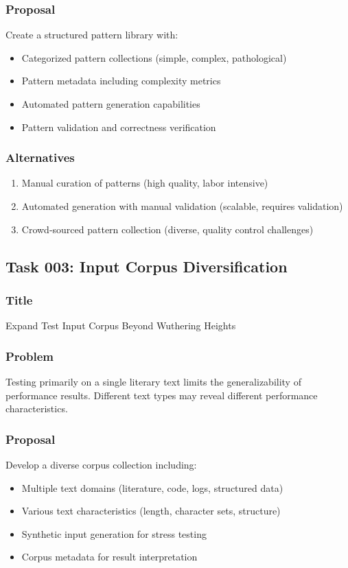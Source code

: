 \documentclass[11pt,a4paper]{article}
\begin{document}
\subsubsection{Proposal}
Create a structured pattern library with:
\begin{itemize}
    \item Categorized pattern collections (simple, complex, pathological)
    \item Pattern metadata including complexity metrics
    \item Automated pattern generation capabilities
    \item Pattern validation and correctness verification
\end{itemize}

\subsubsection{Alternatives}
\begin{enumerate}
    \item Manual curation of patterns (high quality, labor intensive)
    \item Automated generation with manual validation (scalable, requires validation)
    \item Crowd-sourced pattern collection (diverse, quality control challenges)
\end{enumerate}

\subsection{Task 003: Input Corpus Diversification}

\subsubsection{Title}
Expand Test Input Corpus Beyond Wuthering Heights

\subsubsection{Problem}
Testing primarily on a single literary text limits the generalizability of performance results. Different text types may reveal different performance characteristics.

\subsubsection{Proposal}
Develop a diverse corpus collection including:
\begin{itemize}
    \item Multiple text domains (literature, code, logs, structured data)
    \item Various text characteristics (length, character sets, structure)
    \item Synthetic input generation for stress testing
    \item Corpus metadata for result interpretation
\end{itemize}
\end{document}
